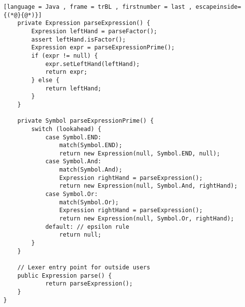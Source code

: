 \begin{lstlisting}[language = Java , frame = trBL , firstnumber = last , escapeinside={(*@}{@*)}]
	private Expression parseExpression() {
    	Expression leftHand = parseFactor();
    	assert leftHand.isFactor();
    	Expression expr = parseExpressionPrime();
    	if (expr != null) {
        	expr.setLeftHand(leftHand);
        	return expr;
    	} else {
        	return leftHand;
    	}
	}

	private Symbol parseExpressionPrime() {
    	switch (lookahead) {
        	case Symbol.END:
            	match(Symbol.END);
            	return new Expression(null, Symbol.END, null);
        	case Symbol.And:
            	match(Symbol.And);
            	Expression rightHand = parseExpression();
            	return new Expression(null, Symbol.And, rightHand);
        	case Symbol.Or:
            	match(Symbol.Or);
            	Expression rightHand = parseExpression();
            	return new Expression(null, Symbol.Or, rightHand);
        	default: // epsilon rule
            	return null;
    	}
	}

	// Lexer entry point for outside users
	public Expression parse() {
    		return parseExpression();
	}
}

\end{lstlisting}